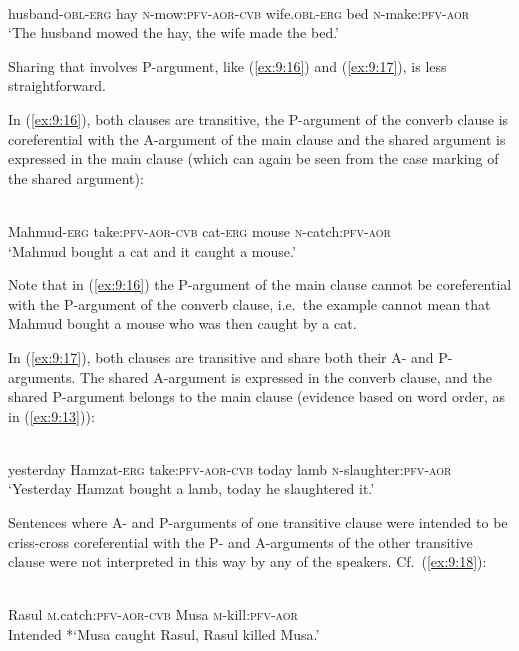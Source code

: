 ﻿\documentclass[output=paper]{langsci/langscibook}
\begin{document}
\ex \label{ex:9:15} %
\\
husband-\textsc{obl}-\textsc{erg} hay \textsc{n}-mow:\textsc{pfv}-\textsc{aor}-\textsc{cvb} wife.\textsc{obl}-\textsc{erg} bed \textsc{n}-make:\textsc{pfv}-\textsc{aor}\\
\glt `The husband mowed the hay, the wife made the bed.'
\z



Sharing that involves P-argument, like (\ref{ex:9:16}) and (\ref{ex:9:17}), is less straightforward.

In (\ref{ex:9:16}), both clauses are transitive, the P-argument of the converb
clause is coreferential with the A-argument of the main clause and the shared
argument is expressed in the main clause (which can again be seen from
the case marking of the shared argument):

\ea \label{ex:9:16} %
\\
Mahmud-\textsc{erg} take:\textsc{pfv}-\textsc{aor}-\textsc{cvb} cat-\textsc{erg} mouse \textsc{n}-catch:\textsc{pfv}-\textsc{aor}\\
\glt `Mahmud bought a cat and it caught a mouse.'
\z

Note that in (\ref{ex:9:16}) the P-argument of the main clause cannot be coreferential with the P-argument 
of the converb clause, i.e.\ the example cannot mean that Mahmud bought a
mouse who was then caught by a cat.

In (\ref{ex:9:17}), both clauses are transitive
and share both their A- and P-arguments. The shared A-argument is 
expressed in the converb clause, and the shared
P-argument belongs to the main clause (evidence based on word order, as
in (\ref{ex:9:13})):

\ea \label{ex:9:17} %
\\
yesterday Hamzat-\textsc{erg} take:\textsc{pfv}-\textsc{aor}-\textsc{cvb} today lamb \textsc{n}-slaughter:\textsc{pfv}-\textsc{aor}\\
\glt `Yesterday Hamzat bought a lamb, today he slaughtered it.'
\z

Sentences where A- and P-arguments of one transitive clause were intended to be 
criss-cross coreferential with the P- and A-arguments of the other transitive clause were
not interpreted in this way by any of the speakers. Cf.\
(\ref{ex:9:18}):

\ea \label{ex:9:18} %
\\
Rasul \textsc{m}.catch:\textsc{pfv}-\textsc{aor}-\textsc{cvb} Musa \textsc{m}-kill:\textsc{pfv}-\textsc{aor}\\
\glt Intended *`Musa caught Rasul, Rasul killed Musa.'
\end{document}
